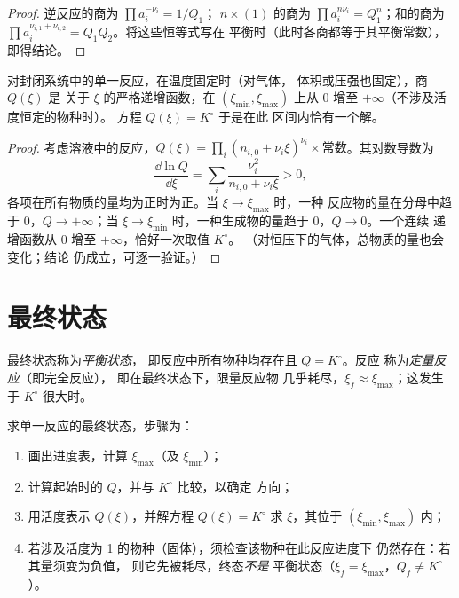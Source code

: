 \begin{proof}
逆反应的商为 $\prod a_i^{-\nu_i} = 1/Q_1$；
$n \times (1)$ 的商为 $\prod a_i^{n\nu_i} = Q_1^n$；和的商为
$\prod a_i^{\nu_{i,1} + \nu_{i,2}} = Q_1 Q_2$。将这些恒等式写在
平衡时（此时各商都等于其平衡常数），即得结论。
\end{proof}

\begin{proposition}[唯一平衡状态]\label{prop:b1:extent-q-and-k:q-monotone}
对封闭系统中的单一反应，在温度固定时（对气体，
体积或压强也固定），商 $Q(\xi)$ 是
关于 $\xi$ 的严格递增函数，在 $(\xi_{\min}, \xi_{\max})$ 上从 0
增至 $+\infty$（不涉及活度恒定的物种时）。
方程 $Q(\xi) = K^\circ$ 于是在此
区间内恰有一个解。
\end{proposition}

\begin{proof}
考虑溶液中的反应，$Q(\xi) = \prod_i (n_{i,0} + \nu_i\xi)^{\nu_i}
\times \text{常数}$。其对数导数为
\[
  \frac{\dd \ln Q}{\dd \xi} = \sum_i \frac{\nu_i^2}{n_{i,0} + \nu_i \xi}
  > 0 ,
\]
各项在所有物质的量均为正时为正。当 $\xi \to \xi_{\max}$ 时，一种
反应物的量在分母中趋于 0，$Q \to +\infty$；当 $\xi
\to \xi_{\min}$ 时，一种生成物的量趋于 0，$Q \to 0$。一个连续
递增函数从 0 增至 $+\infty$，恰好一次取值 $K^\circ$。
（对恒压下的气体，总物质的量也会变化；结论
仍成立，可逐一验证。）
\end{proof}

\section{最终状态}

\begin{definition}\label{def:b1:extent-q-and-k:quantitative}
最终状态称为\emph{平衡状态}，
即反应中所有物种均存在且 $Q = K^\circ$。反应
称为\emph{定量反应}（即完全反应），
即在最终状态下，限量反应物
几乎耗尽，$\xi_f \approx \xi_{\max}$；这发生于 $K^\circ$
很大时。
\end{definition}

\begin{method}[求最终状态]\label{met:b1:extent-q-and-k:final-state}
求单一反应的最终状态，步骤为：
\begin{enumerate}
  \item 画出进度表，计算 $\xi_{\max}$（及 $\xi_{\min}$）；
  \item 计算起始时的 $Q$，并与 $K^\circ$ 比较，以确定
        方向；
  \item 用活度表示 $Q(\xi)$，并解方程 $Q(\xi) = K^\circ$
        求 $\xi$，其位于 $(\xi_{\min}, \xi_{\max})$ 内；
  \item 若涉及活度为 1 的物种（固体），须检查该物种在此反应进度下
        仍然存在：若其量须变为负值，
        则它先被耗尽，终态\emph{不是}
        平衡状态（$\xi_f = \xi_{\max}$，$Q_f \ne K^\circ$）。
\end{enumerate}
\end{method}

